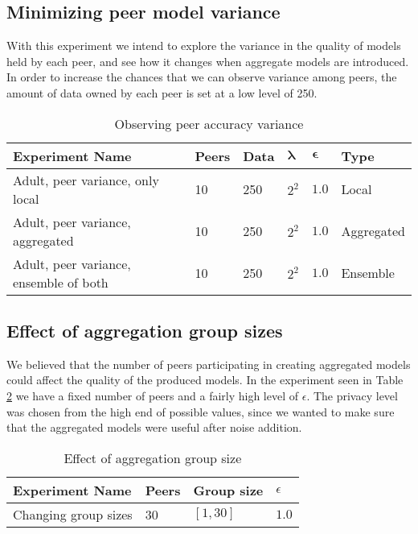 \subsection{Minimizing peer model variance}

With this experiment we intend to explore the variance in the quality of models held by each peer, and see how it changes when aggregate models are introduced. In order to increase the chances that we can observe variance among peers, the amount of data owned by each peer is set at a low level of 250.

\begin{table}[h]
	\centering
	\begin{tabular}{|l|l|l|l|l|l|}
		{\bf Experiment Name}                  & {\bf Peers} & {\bf Data} & $\boldsymbol{\lambda}$ & $\boldsymbol{\epsilon}$ & {\bf Type} \\
		\hline
		Adult, peer variance, only local       & 10          & 250        & $2^{2}$   & $1.0$      & Local      \\
		Adult, peer variance, aggregated       & 10          & 250        & $2^{2}$   & $1.0$      & Aggregated \\
		Adult, peer variance, ensemble of both & 10          & 250        & $2^{2}$   & $1.0$      & Ensemble  
	\end{tabular}
	\caption{Observing peer accuracy variance}
	\label{tab:experiments_peer_variance}
\end{table}

\subsection{Effect of aggregation group sizes}

We believed that the number of peers participating in creating aggregated models could affect the quality of the produced models. In the experiment seen in Table \ref{tab:experiments_group_sizes} we have a fixed number of peers and a fairly high level of $\epsilon$. The privacy level was chosen from the high end of possible values, since we wanted to make sure that the aggregated models were useful after noise addition.

\begin{table}[h]
	\centering
	\begin{tabular}{|l|l|l|l|}
		{\bf Experiment Name} & {\bf Peers} & {\bf Group size} & $\epsilon$ \\
		\hline
		Changing group sizes  & 30          & $[1, 30]$      &     $1.0$     \\ 
	\end{tabular}
	\caption{Effect of aggregation group size}
	\label{tab:experiments_group_sizes}
\end{table}
 
